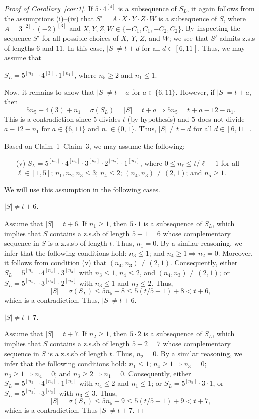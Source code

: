 \documentclass[12 pt]{amsart}
\def \n{\noindent }
\def \bs{\bigskip}
\def \zs{z.s.s }
\def \zsb{z.s.s{\tiny b} }
\begin{document}
\begin{proof}[Proof of Corollary~\ref{cor:1}]
If $5\cdot 4^{[4]}$ is a subsequence of $S_L$, it again follows from the assumptions (i)--(iv) that 
$S'=A\cdot X\cdot Y\cdot Z\cdot W$ is a subsequence of $S$, where  $A=3^{[2]}\cdot(-2)^{[3]}$ and $X,Y,Z,W\in\{-C_1,C_1,-C_2,C_2\}$.
By inspecting the sequence $S'$ for all possible choices 
of $X$, $Y$, $Z$, and $W$; we see that $S'$ admits \zs of lengths $6$ and $11$. In this case, $|S|\not=t+d$ for all $d\in[6,11]$. 
Thus, we may assume that 

\centerline{$S_L=5^{[n_5]}\cdot 4^{[3]}\cdot 1^{[n_1]}$, where $n_5\geq 2$ and $n_1\leq 1$.}

\n Now, it remains to show that $|S|\not=t+a$ for $a\in\{6,11\}$.
However, if $|S|=t+a$, then 
\[5{n_5}+4(3)+{n_1}=\sigma(S_L)=|S|=t+a\Rightarrow 5{n_5}=t+a-12-{n_1}.\] This  is a contradiction since $5$ divides $t$ (by hypothesis) and $5$ does not divide $a-12-{n_1}$
for $a\in\{6,11\}$ and ${n_1}\in\{0,1\}$. Thus, $|S|\not=t+d$ for all $d\in[6,11]$.

\bs Based on Claim~1--Claim~3, we may assume the following:
\begin{enumerate}
	\item[(v)] $S_L=5^{[n_5]}\cdot 4^{[n_4]}\cdot 3^{[n_3]}\cdot 2^{[n_2]}\cdot1^{[n_1]}$, where $0\leq n_\ell\leq t/\ell-1$ for all $\ell\in[1,5]$; ${n_1},{n_2},{n_3}\leq3$; ${n_4}\leq 2$; $(n_4,n_3)\not=(2,1)$;  and $n_5\geq1$.
\end{enumerate}
We will use this assumption in the following cases.

\bs\n {\bf Case 1:} {\em $|S|\not=t+6$.}

Assume that $|S|=t+6$. If ${n_1}\geq1$,
then $5\cdot 1$ is a subsequence of $S_L$, which 
implies that $S$ contains a \zsb of length $5+1=6$ 
whose complementary sequence in $S$ is a \zsb of length $t$.  Thus,
${n_1}=0$. By a similar reasoning, we infer that the following 
conditions hold: ${n_3}\leq 1$; and $n_4\geq 1\Rightarrow{n_2}=0$. 
Moreover, it follows from condition (v) that $(n_4,n_3)\not=(2,1)$.
Consequently, either $S_L=5^{[n_5]}\cdot 4^{[n_4]}\cdot 3^{[n_3]}$
with $n_3\leq 1$, ${n_4}\leq 2$, and $(n_4,n_3)\not=(2,1)$; or  $S_L=5^{[n_5]}\cdot 3^{[n_3]}\cdot2^{[n_2]}$
with $n_3\leq 1$ and ${n_2}\leq 2$. Thus,
\[|S|=\sigma(S_L)\leq 5{n_5}+8\leq 5(t/5-1)+8<t+6,\]
which is a contradiction. Thus, $|S|\not=t+6$.


\bs
\bs\n {\bf Case 2:} {\em $|S|\not=t+7$.}

Assume that $|S|=t+7$. If $n_2\geq1$,
then $5\cdot 2$ is a subsequence of $S_L$, which 
implies that $S$ contains a \zsb of length $5+2=7$ 
whose complementary sequence in $S$ is a \zsb of length $t$.  Thus,
$n_2=0$. By a similar reasoning, we infer that the following 
conditions hold:  ${n_1}\leq 1$;  
${n_4}\geq1\Rightarrow {n_3}=0$; ${n_3}\geq1\Rightarrow {n_4}=0$; and ${n_3}\geq2\Rightarrow {n_1}=0$. Consequently, either $S_L=5^{[n_5]}\cdot 4^{[n_4]}\cdot 1^{[n_1]}$
with ${n_4}\leq2$ and $n_1\leq 1$; or $S_L=5^{[n_5]}\cdot 3\cdot 1$, or $S_L=5^{[n_5]}\cdot 3^{[n_3]}$ with $n_3\leq3$. Thus, 
\[|S|=\sigma(S_L)\leq 5{n_5}+9\leq 5(t/5-1)+9<t+7,\]
which is a contradiction. Thus  $|S|\not=t+7$.


\end{proof}
\end{document}
